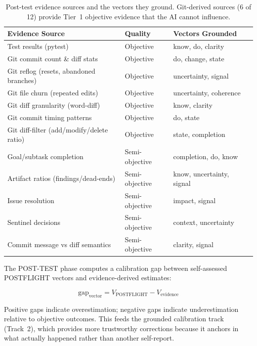 \begin{table}[h]
\centering
\begin{tabular}{llll}
\toprule
\textbf{Evidence Source} & \textbf{Quality} & \textbf{Vectors Grounded} \\
\midrule
Test results (pytest) & Objective & know, do, clarity \\
Git commit count \& diff stats & Objective & do, change, state \\
Git reflog (resets, abandoned branches) & Objective & uncertainty, signal \\
Git file churn (repeated edits) & Objective & uncertainty, coherence \\
Git diff granularity (word-diff) & Objective & know, clarity \\
Git commit timing patterns & Objective & do, state \\
Git diff-filter (add/modify/delete ratio) & Objective & state, completion \\
Goal/subtask completion & Semi-objective & completion, do, know \\
Artifact ratios (findings/dead-ends) & Semi-objective & know, uncertainty, signal \\
Issue resolution & Semi-objective & impact, signal \\
Sentinel decisions & Semi-objective & context, uncertainty \\
Commit message vs diff semantics & Semi-objective & clarity, signal \\
\bottomrule
\end{tabular}
\caption{Post-test evidence sources and the vectors they ground. Git-derived sources (6 of 12) provide Tier~1 objective evidence that the AI cannot influence.}
\label{tab:posttest-evidence}
\end{table}

The POST-TEST phase computes a calibration gap between self-assessed POSTFLIGHT vectors and evidence-derived estimates:

\begin{equation}
\text{gap}_{\text{vector}} = V_{\text{POSTFLIGHT}} - V_{\text{evidence}}
\end{equation}

Positive gaps indicate overestimation; negative gaps indicate underestimation relative to objective outcomes. This feeds the grounded calibration track (Track~2), which provides more trustworthy corrections because it anchors in what actually happened rather than another self-report.


